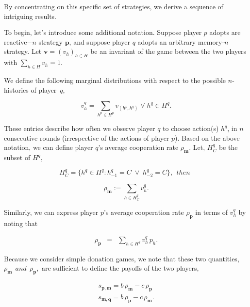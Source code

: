 \documentclass{article}
\theoremstyle{definition}
\begin{document}
By concentrating on this specific set of strategies, we derive a sequence of
intriguing results.

To begin, let's introduce some additional notation. Suppose player $p$ adopts
are reactive$-n$ strategy $\mathbf{p}$, and suppose player $q$ adopts an
arbitrary memory-$n$ strategy. Let $\mathbf{v}=(v_h)_{h\in H}$ be an invariant
of the game between the two players with $\displaystyle \sum_{h \in H} v_h = 1$.

We define the following marginal distributions with respect to the possible $n$-histories of player~$q$,

\begin{equation}
\displaystyle v^q_{h} = \sum_{h^p\in H^p} v_{(h^p,h^q)} \; \forall \; h^q \in H^q.
\end{equation}

These entries describe how often we observe player $q$ to choose action(s)
$h^q$, in $n$ consecutive rounds (irrespective of the actions of player $p$).
Based on the above notation, we can define player $q$'s average cooperation rate
$\rho_\mathbf{m}$. Let, $H^{q}_{C}$ be the subset of $H^{q}$,

\begin{equation}
  H^{q}_{C} = \{h^q \in H^q : h^q_{-1} = C \; \lor \; h^q_{-2} = C\}, ~~then~~
\end{equation}

\begin{equation} \label{Eq:rhoq_alln}
  \rho_\mathbf{m} := \displaystyle \sum_{h \in H^{q}_{C}} v^q_{h}.
\end{equation}

Similarly, we can express player $p$'s average cooperation rate
$\rho_\mathbf{p}$ in terms of $v^q_{h}$ by
noting that

\begin{equation} \label{Eq:rhop_alln}
  \begin{array}{lll}
    \rho_\mathbf{p} &= &\displaystyle \sum_{h \in H^q} v^q_{h}\, p_{h}.
  \end{array}
\end{equation}

Because we consider simple donation games, we note that these two quantities,
$\rho_\mathbf{m}  ~~and~~ \rho_\mathbf{p},$ are
sufficient to define the payoffs of the two players,

\begin{equation} \label{Eq:payoff}
  \begin{array}{lll}
  s_{\mathbf{p}, \mathbf{m}}  =  b\, \rho_\mathbf{m} - c\, \rho_\mathbf{p}\\
  s_{\mathbf{m}, \mathbf{q}} = b\, \rho_\mathbf{p} - c\, \rho_\mathbf{m}.
  \end{array}
\end{equation}
\end{document}
